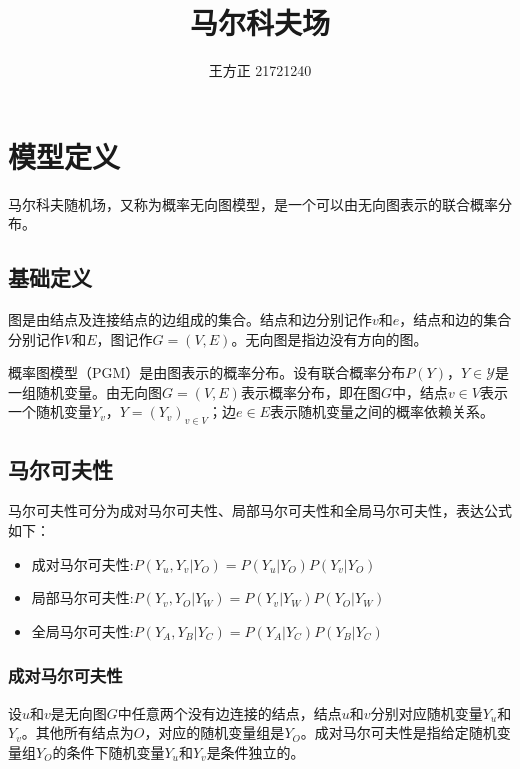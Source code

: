 \documentclass[12pt]{report}
\title{马尔科夫场}
\author{王方正 21721240}
\date{}
\begin{document}
		
	\maketitle
		
	\tableofcontents
	
	\renewcommand\thesection{\arabic {section}}
		
	\section{模型定义}
	
		马尔科夫随机场，又称为概率无向图模型，是一个可以由无向图表示的联合概率分布。
		
		\subsection{基础定义}
		
			图是由结点及连接结点的边组成的集合。结点和边分别记作$v$和$e$，结点和边的集合分别记作$V$和$E$，图记作$G=(V,E)$。无向图是指边没有方向的图。
		
			概率图模型（PGM）是由图表示的概率分布。设有联合概率分布$P(Y)$，$Y\in\mathcal{Y}$是一组随机变量。由无向图$G=(V,E)$表示概率分布，即在图$G$中，结点$v\in V$表示一个随机变量$Y_v$，$Y=(Y_v)_{v\in V}$；边$e\in E$表示随机变量之间的概率依赖关系。
				
		\subsection{马尔可夫性}
		
			马尔可夫性可分为成对马尔可夫性、局部马尔可夫性和全局马尔可夫性，表达公式如下：
		
			\begin{itemize}
				\item 成对马尔可夫性:$P(Y_u,Y_v|Y_O)=P(Y_u|Y_O)P(Y_v|Y_O)$
				\item 局部马尔可夫性:$P(Y_v,Y_O|Y_W)=P(Y_v|Y_W)P(Y_O|Y_W)$
				\item 全局马尔可夫性:$P(Y_A,Y_B|Y_C)=P(Y_A|Y_C)P(Y_B|Y_C)$
			\end{itemize}
		
			\subsubsection{成对马尔可夫性}	
			
				设$u$和$v$是无向图$G$中任意两个没有边连接的结点，结点$u$和$v$分别对应随机变量$Y_u$和$Y_v$。其他所有结点为$O$，对应的随机变量组是$Y_O$。成对马尔可夫性是指给定随机变量组$Y_O$的条件下随机变量$Y_u$和$Y_v$是条件独立的。
				
\end{document}
